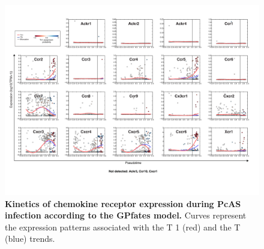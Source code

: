 \begin{figure}
    \centering
    \includegraphics[width=\textwidth]{"Fig S17 rev3"}
    \caption[Kinetics of chemokine receptor expression during PcAS infection according to the GPfates model]{\textbf{Kinetics of chemokine receptor expression during PcAS infection according to the GPfates model.} Curves represent the expression patterns associated with the T 1 (red) and the T (blue) trends.}
    \label{fig:ms17}
\end{figure}

